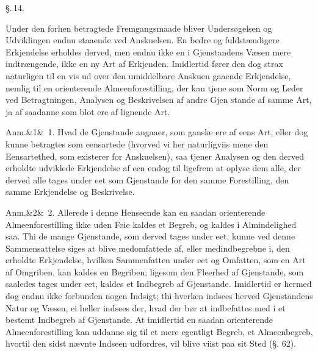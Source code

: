 \documentclass[12pt]{book}
\def\sperr#1{#1}%
\def\textit#1{#1}%
\def\emph#1{#1}%
\newcommand{\sperr}[1]{\textls[180]{#1}}
\newcommand{\parag}[1]{%
  \par\vspace{0.9\baselineskip}%
  {\centering\textit{\S.\,#1.}\par}%
  \vspace{0.35\baselineskip}%
  \noindent\hspace{\parindent}\ignorespaces
}
\newcommand{\anm}[1]{%
  \par\vspace{0.5\baselineskip}%
  \noindent\hspace{\parindent}\sperr{Anm.}\ifx&#1&\else~\textit{#1}.\fi
  \enspace\ignorespaces
}
\newcommand{\opage}[1]{\marginnote{\footnotesize\textit{[#1]}}}
\begin{document}
\parag{14}

Under den forhen betragtede Fremgangsmaade bliver Undersøgelsen og Udviklingen
endnu staaende ved Anskuelsen. En bedre og fuldstændigere Erkjendelse erholdes
derved, men endnu ikke en i Gjenstandens Væsen mere indtrængende, ikke en ny Art
af Erkjenden. Imidlertid fører den dog strax naturligen til en vis ud over den
umiddelbare Anskuen gaaende Erkjendelse, nemlig til en \emph{orienterende
Almeenforestilling}, der kan tjene som Norm og Leder ved Betragtningen, Analysen
og Beskrivelsen af andre Gjen%
\opage{35}stande af samme Art, ja af saadanne som blot ere af lignende Art.

\anm{1} Hvad de Gjenstande angaaer, som ganske ere af eens Art, eller dog kunne
betragtes som eensartede (hvorved vi her naturligviis mene den
\emph{Eensartethed}, som existerer for Anskuelsen), saa tjener Analysen og den
derved erholdte udviklede Erkjendelse af een endog til ligefrem at oplyse dem
alle, der derved alle tages under eet som Gjenstande for den samme Forestilling,
den samme Erkjendelse og Beskrivelse.

\anm{2} Allerede i denne Henseende kan en saadan orienterende
Almeenforestilling ikke uden Føie kaldes et Begreb, og kaldes i Almindelighed
saa. Thi de mange Gjenstande, som derved tages under eet, kunne ved denne
Sammensattelse siges at blive medomfattede af, eller medindbegrebne i, den
erholdte Erkjendelse, hvilken \emph{Sammenfatten under eet og Omfatten}, som en
Art af \emph{Omgriben}, kan kaldes en \emph{Begriben}; ligesom den Fleerhed af
Gjenstande, som saaledes tages under eet, kaldes et \emph{Indbegreb af
Gjenstande}. Imidlertid er hermed dog endnu ikke forbunden nogen
\emph{Indsigt}; thi hverken indsees herved Gjenstandens Natur og Væsen, ei heller
indsees der, hvad der bør at indbefattes med i et bestemt Indbegreb af
Gjenstande. At imidlertid en saadan orienterende Almeenforestilling kan uddanne
sig til et mere egentligt Begreb, et \emph{Almeenbegreb}, hvortil den sidst%
\opage{36}%
nævnte Indseen udfordres, vil blive viist paa sit Sted (§. 62).
\end{document}
